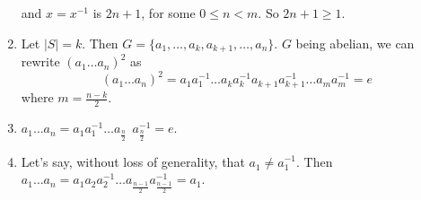 \documentclass{article}
\begin{document}
\begin{enumerate}
        and $x = x^{-1}$ is $2n + 1$, for some $0 \leqslant n < m$. So $2n + 1 \geqslant 1$.
    \item Let $|S| = k$. Then $G = \{a_1, \ldots, a_k, a_{k+1}, \ldots, a_n\}$. $G$ being abelian, we can rewrite $(a_1\ldots a_n)^2$ as 
        $$(a_1\ldots a_n)^2 = a_1a_1^{-1}\ldots a_ka_k^{-1}a_{k+1}a_{k+1}^{-1}\ldots a_{m}a_{m}^{-1} = e$$ where $m = \frac{n - k}{2}$.
    \item $a_1\ldots a_n = a_1a_1^{-1}\ldots a_{\frac{n}{2}}^{\phantom{-1}}a_{\frac{n}{2}}^{-1} = e$.
    \item Let's say, without loss of generality, that $a_1^{\phantom{1}} \ne a_1^{-1}$. Then $a_1\ldots a_n = a_1a_2a_2^{-1}\ldots a_{\frac{n-1}{2}}^{\phantom{-1}}a_{\frac{n-1}{2}}^{-1} = a_1$.
\end{enumerate}
\end{document}
